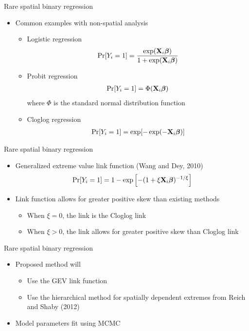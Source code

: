\documentclass{beamer}
\begin{document}
\begin{frame}{Rare spatial binary regression}
  \begin{itemize} \setlength{\itemsep}{0.5em}
    \item Common examples with non-spatial analysis
    \begin{itemize}
      \item Logistic regression
      \begin{align*}
        \Pr[Y_i = 1] = \frac{ \exp(\mbox{\bf X}_i \mbox{\boldmath $\beta$}) }{ 1 + \exp(\mbox{\bf X}_i \mbox{\boldmath $\beta$})}
      \end{align*}
      \item Probit regression
      \begin{align*}
        \Pr[Y_i = 1] = \Phi(\mbox{\bf X}_i \mbox{\boldmath $\beta$})
      \end{align*}
      where $\Phi$ is the standard normal distribution function
      \item Cloglog regression
      \begin{align*}
        \Pr[Y_i = 1] = \exp[ -\exp(-\mbox{\bf X}_i \mbox{\boldmath $\beta$})]
      \end{align*}
    \end{itemize}
  \end{itemize}
\end{frame}

\begin{frame}{Rare spatial binary regression}
  \begin{itemize} \setlength{\itemsep}{0.5em}
    \item Generalized extreme value link function (Wang and Dey, 2010)
    \begin{align*}
      \Pr[Y_i = 1] = 1 - \exp\left[-(1 + \xi \mbox{\bf X}_i \mbox{\boldmath $\beta$})^{-1 / \xi} \right]
    \end{align*}
    \item Link function allows for greater positive skew than existing methods
    \begin{itemize}
      \item When $\xi = 0$, the link is the Cloglog link
      \item When $\xi > 0$, the link allows for greater positive skew than Cloglog link
    \end{itemize}
  \end{itemize}
\end{frame}

\begin{frame}{Rare spatial binary regression}
  \begin{itemize} \setlength{\itemsep}{0.5em}
    \item Proposed method will
    \begin{itemize}
      \item Use the GEV link function
      \item Use the hierarchical method for spatially dependent extremes from Reich and Shaby (2012)
    \end{itemize}
    \item Model parameters fit using MCMC
  \end{itemize}
\end{frame}
\end{document}
